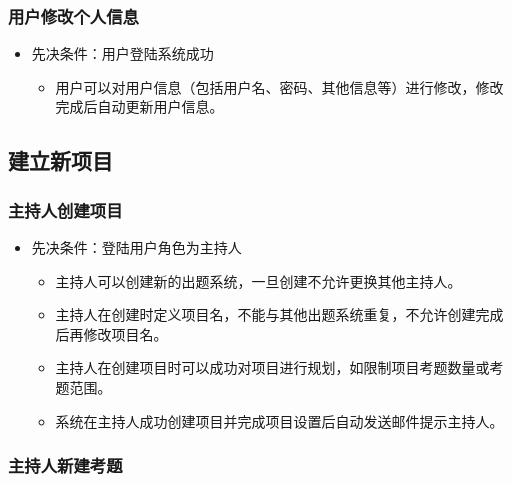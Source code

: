 \documentclass[hyperref, a4paper]{ctexart}
\providecommand{\tightlist}{%
  \setlength{\itemsep}{0pt}\setlength{\parskip}{0pt}}
\begin{document}
\hypertarget{ux7528ux6237ux4feeux6539ux4e2aux4ebaux4fe1ux606f}{%
\subsubsection{用户修改个人信息}\label{ux7528ux6237ux4feeux6539ux4e2aux4ebaux4fe1ux606f}}

\begin{itemize}
\tightlist
\item
  先决条件：用户登陆系统成功

  \begin{itemize}
  \tightlist
  \item
    用户可以对用户信息（包括用户名、密码、其他信息等）进行修改，修改完成后自动更新用户信息。
  \end{itemize}
\end{itemize}

\hypertarget{ux5efaux7acbux65b0ux9879ux76ee}{%
\subsection{建立新项目}\label{ux5efaux7acbux65b0ux9879ux76ee}}

\hypertarget{ux4e3bux6301ux4ebaux521bux5efaux9879ux76ee}{%
\subsubsection{主持人创建项目}\label{ux4e3bux6301ux4ebaux521bux5efaux9879ux76ee}}

\begin{itemize}
\tightlist
\item
  先决条件：登陆用户角色为主持人

  \begin{itemize}
  \tightlist
  \item
    主持人可以创建新的出题系统，一旦创建不允许更换其他主持人。
  \item
    主持人在创建时定义项目名，不能与其他出题系统重复，不允许创建完成后再修改项目名。
  \item
    主持人在创建项目时可以成功对项目进行规划，如限制项目考题数量或考题范围。
  \item
    系统在主持人成功创建项目并完成项目设置后自动发送邮件提示主持人。
  \end{itemize}
\end{itemize}

\hypertarget{ux4e3bux6301ux4ebaux65b0ux5efaux8003ux9898}{%
\subsubsection{主持人新建考题}\label{ux4e3bux6301ux4ebaux65b0ux5efaux8003ux9898}}
\end{document}
